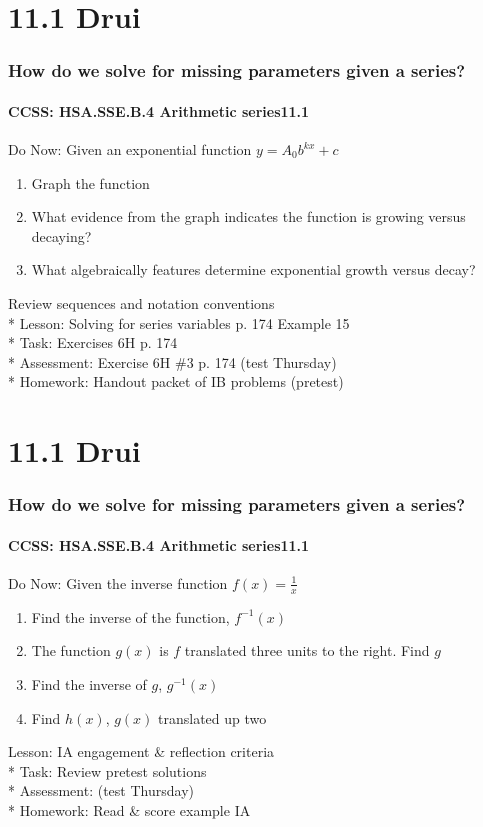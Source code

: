 \documentclass{beamer}
\begin{document}
  \section{11.1 Drui}
  \frame
  {
    \frametitle{How do we solve for missing parameters given a series?}
    \framesubtitle{CCSS: HSA.SSE.B.4 Arithmetic series\qquad \alert{11.1}}

    \begin{block}{Do Now: Given an exponential function $y=A_0b^{kx}+c$}
    \begin{enumerate}
        \item Graph the function
        \item What evidence from the graph indicates the function is growing versus decaying?
        \item What algebraically features determine exponential growth versus decay?
    \end{enumerate}
    \end{block}
    Review sequences and notation conventions\\*
    Lesson: Solving for series variables p. 174 Example 15 \\*
    Task: Exercises 6H p. 174\\*
    Assessment: Exercise 6H \#3 p. 174 \alert{(test Thursday)}\\*
    Homework: Handout packet of IB problems (pretest)
  }

  \section{11.1 Drui}
  \frame
  {
    \frametitle{How do we solve for missing parameters given a series?}
    \framesubtitle{CCSS: HSA.SSE.B.4 Arithmetic series\qquad \alert{11.1}}

    \begin{block}{Do Now: Given the inverse function $f(x)=\frac{1}{x}$}
    \begin{enumerate}
        \item Find the inverse of the function, $f^{-1}(x)$
        \item The function $g(x)$ is $f$ translated three units to the right. Find $g$
        \item Find the inverse of $g$, $g^{-1}(x)$
        \item Find $h(x)$, $g(x)$ translated up two
    \end{enumerate}
    \end{block}
    Lesson: IA engagement \& reflection criteria\\*
    Task: Review pretest solutions\\*
    Assessment: \alert{(test Thursday)}\\*
    Homework: Read \& score example IA
  }
\end{document}
